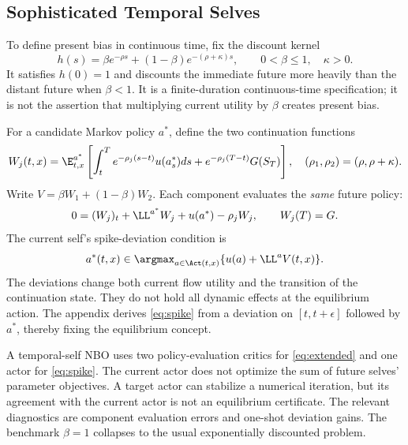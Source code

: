 \subsection{Sophisticated Temporal Selves}\label{sec:temporal}
To define present bias in continuous time, fix the discount kernel
\begin{equation}\label{eq:kernel}
 h(s)=\beta e^{-\rho s}+(1-\beta)e^{-(\rho+\kappa)s},
 \qquad 0<\beta\leq1,\quad\kappa>0.
\end{equation}
It satisfies $h(0)=1$ and discounts the immediate future more heavily than the distant future when $\beta<1$. It is a finite-duration continuous-time specification; it is not the assertion that multiplying current utility by $\beta$ creates present bias.

For a candidate Markov policy $a^*$, define the two continuation functions
\begin{equation}\label{eq:components}
 W_j(t,x)=\E_{t,x}^{a^*}\left[\int_t^T e^{-\rho_j(s-t)}u(a_s^*)ds
             +e^{-\rho_j(T-t)}G(S_T)\right],\quad
 (\rho_1,\rho_2)=(\rho,\rho+\kappa).
\end{equation}
Write $V=\beta W_1+(1-\beta)W_2$. Each component evaluates the \emph{same} future policy:
\begin{equation}\label{eq:extended}
 0=(W_j)_t+\LL^{a^*}W_j+u(a^*)-\rho_jW_j,\qquad W_j(T)=G.
\end{equation}
The current self's spike-deviation condition is
\begin{equation}\label{eq:spike}
 a^*(t,x)\in\argmax_{a\in\Act(t,x)}\{u(a)+\LL^aV(t,x)\}.
\end{equation}
The deviations change both current flow utility and the transition of the continuation state. They do not hold all dynamic effects at the equilibrium action. The appendix derives \eqref{eq:spike} from a deviation on $[t,t+\epsilon]$ followed by $a^*$, thereby fixing the equilibrium concept.

A temporal-self NBO uses two policy-evaluation critics for \eqref{eq:extended} and one actor for \eqref{eq:spike}. The current actor does not optimize the sum of future selves' parameter objectives. A target actor can stabilize a numerical iteration, but its agreement with the current actor is not an equilibrium certificate. The relevant diagnostics are component evaluation errors and one-shot deviation gains. The benchmark $\beta=1$ collapses to the usual exponentially discounted problem.

